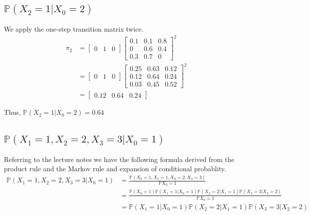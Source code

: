 \documentclass{article}
\newcommand{\prob}{\mathbb{P}}
\begin{document}
\subsection{$\prob(X_2 = 1 | X_0 = 2)$}
We apply the one-step transition matrix twice.
\begin{align*}
    \pi_2
    &=
    \begin{bmatrix}
        0 & 1 & 0
    \end{bmatrix}
    \begin{bmatrix}
        0.1 & 0.1 & 0.8 \\
          0 & 0.6 & 0.4 \\
        0.3 & 0.7 &   0
    \end{bmatrix}^2 \\
    &=
    \begin{bmatrix}
        0 & 1 & 0
    \end{bmatrix}
    \begin{bmatrix}
        0.25 & 0.63 & 0.12 \\
        0.12 & 0.64 & 0.24 \\
        0.03 & 0.45 & 0.52
    \end{bmatrix}^2 \\
    &=
    \begin{bmatrix}
        0.12 & 0.64 & 0.24
    \end{bmatrix}
\end{align*}

Thus, $\prob(X_2 = 1 | X_0 = 2) = 0.64$

\subsection{$\prob(X_1 = 1, X_2 = 2, X_3 = 3 | X_0 = 1)$}
Referring to the lecture notes we have the following formula derived from the
product rule and the Markov rule and expansion of conditional probablity.
\begin{align*}
    \prob(X_1 = 1, X_2 = 2, X_3 = 3 | X_0 = 1)
    &= \frac{\prob(X_0 = 1, X_1 = 1, X_2 = 2, X_3 = 3)}{\prob {X_0 = 1}} \\
    &= \frac{\prob(X_0 = 1) \prob(X_1 = 1 | X_0 = 1) \prob(X_2 = 2 | X_1 = 1) \prob(X_3 = 3 | X_2 = 2)}
        {\prob {X_0 = 1}} \\
    &= \prob(X_1 = 1 | X_0 = 1) \prob(X_2 = 2 | X_1 = 1) \prob(X_3 = 3 | X_2 = 2)
\end{align*}
\end{document}
